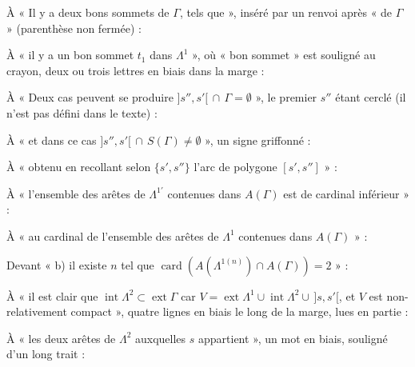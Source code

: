 \documentclass[11pt,a4paper]{article}
\begin{document}
À « Il y a deux bons sommets de $\Gamma$,  tels que »,
inséré par un renvoi après « de $\Gamma$ » (parenthèse non fermée) :

À « il y a un bon sommet $t_1$ dans $\Lambda^1$ », où « bon sommet » est
souligné au crayon, deux ou trois lettres en biais dans la marge :
\marginal{\ill{}}

À « Deux cas peuvent se produire $]s'',s'[\, \cap\, \Gamma = \emptyset$ »,
le premier $s''$ étant cerclé (il n'est pas défini dans le texte) :

À « et dans ce cas $]s'',s'[\, \cap\, S(\Gamma) \neq \emptyset$ », un signe
griffonné : \marginal{\ill{}}

À « obtenu en recollant selon $\{s', s''\}$ l'arc de polygone $[s',s'']$ » :
\marginal{!}

À « l'ensemble des arêtes de $\Lambda^{1\prime}$ contenues dans $A(\Gamma)$
est de cardinal inférieur » : 

À « au cardinal de l'ensemble des arêtes de $\Lambda^1$ contenues dans
$A(\Gamma)$ » : 


Devant « b) il existe $n$ tel que $\operatorname{card}(A(\Lambda^{1(n)})
\cap A(\Gamma)) = 2$ » : 

À « il est clair que $\operatorname{int}\Lambda^2 \subset
\operatorname{ext}\Gamma$ car $V = \operatorname{ext}\Lambda^1 \cup
\operatorname{int}\Lambda^2 \cup\, ]s,s'[$, et $V$ est non-relativement
compact », quatre lignes en biais le long de la marge, lues en partie :

À « les deux arêtes de $\Lambda^2$ auxquelles $s$ appartient », un mot en
biais, souligné d'un long trait : \marginal{\ill{}}
\end{document}
